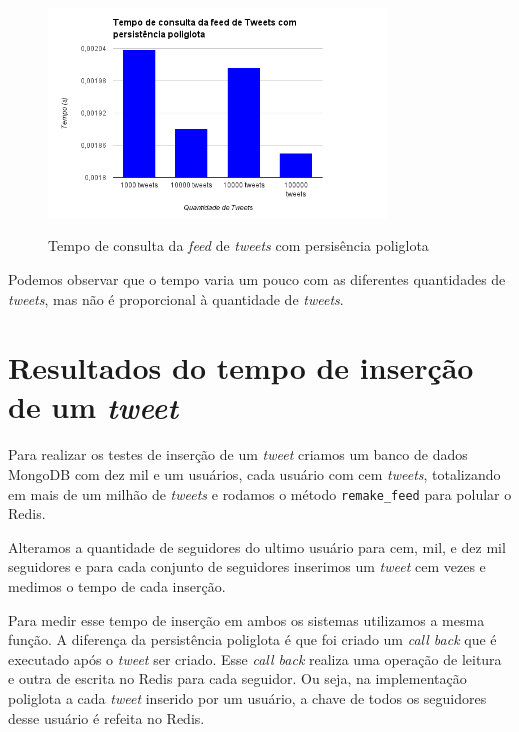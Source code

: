\begin{figure}[H]
    \centering
    \caption{Tempo de consulta da \textit{feed} de \textit{tweets} com persisência poliglota}
    \includegraphics[width=0.8\textwidth]{./04-figuras/time_feed_poli.png}
    \label{fig:time_feed_poli}
\end{figure}



Podemos observar que o tempo varia um pouco com as diferentes quantidades de \textit{tweets}, mas não é proporcional à quantidade de \textit{tweets}.

\section{Resultados do tempo de inserção de um \textit{tweet}}
\label{sec:resultInsertTweet}
Para realizar os testes de inserção de um \textit{tweet} criamos um banco de dados MongoDB com dez mil e um usuários, cada usuário com cem \textit{tweets}, totalizando em mais de um milhão de \textit{tweets} e rodamos o método \verb|remake_feed| para polular o \ac{Redis}. 

Alteramos a quantidade de seguidores do ultimo usuário para cem, mil, e dez mil seguidores e para cada conjunto de seguidores inserimos um \textit{tweet} cem vezes e medimos o tempo de cada inserção.

Para medir esse tempo de inserção em ambos os sistemas utilizamos a mesma função. A diferença da persistência poliglota é que foi criado um \textit{call back} que é executado após o \textit{tweet} ser criado. Esse \textit{call back} realiza uma operação de leitura e outra de escrita no \ac{Redis} para cada seguidor. Ou seja, na implementação poliglota a cada \textit{tweet} inserido por um usuário, a chave de todos os seguidores desse usuário é refeita no \ac{Redis}. 

